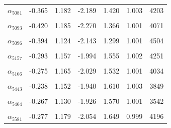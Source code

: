 \begin{longtable}{lrrrrrr}
$\alpha_{5081}$ & -0.365 & 1.182 & -2.189 & 1.420 & 1.003 & 4203\\
\cellcolor{gray!10}{$\alpha_{5083}$} & \cellcolor{gray!10}{-0.378} & \cellcolor{gray!10}{1.200} & \cellcolor{gray!10}{-2.187} & \cellcolor{gray!10}{1.481} & \cellcolor{gray!10}{1.000} & \cellcolor{gray!10}{4548}\\
$\alpha_{5093}$ & -0.420 & 1.185 & -2.270 & 1.366 & 1.001 & 4071\\
\cellcolor{gray!10}{$\alpha_{5095}$} & \cellcolor{gray!10}{0.193} & \cellcolor{gray!10}{1.360} & \cellcolor{gray!10}{-1.600} & \cellcolor{gray!10}{2.563} & \cellcolor{gray!10}{1.003} & \cellcolor{gray!10}{1155}\\
$\alpha_{5096}$ & -0.394 & 1.124 & -2.143 & 1.299 & 1.001 & 4504\\
\cellcolor{gray!10}{$\alpha_{5116}$} & \cellcolor{gray!10}{-0.564} & \cellcolor{gray!10}{1.163} & \cellcolor{gray!10}{-2.444} & \cellcolor{gray!10}{1.163} & \cellcolor{gray!10}{1.000} & \cellcolor{gray!10}{3798}\\
$\alpha_{5157}$ & -0.293 & 1.157 & -1.994 & 1.555 & 1.002 & 4251\\
\cellcolor{gray!10}{$\alpha_{5161}$} & \cellcolor{gray!10}{-0.636} & \cellcolor{gray!10}{1.159} & \cellcolor{gray!10}{-2.503} & \cellcolor{gray!10}{1.059} & \cellcolor{gray!10}{1.001} & \cellcolor{gray!10}{2994}\\
$\alpha_{5166}$ & -0.275 & 1.165 & -2.029 & 1.532 & 1.001 & 4034\\
\cellcolor{gray!10}{$\alpha_{5407}$} & \cellcolor{gray!10}{-0.095} & \cellcolor{gray!10}{1.196} & \cellcolor{gray!10}{-1.818} & \cellcolor{gray!10}{1.845} & \cellcolor{gray!10}{1.001} & \cellcolor{gray!10}{2570}\\
$\alpha_{5443}$ & -0.238 & 1.152 & -1.940 & 1.610 & 1.003 & 3849\\
\cellcolor{gray!10}{$\alpha_{5450}$} & \cellcolor{gray!10}{-0.302} & \cellcolor{gray!10}{1.166} & \cellcolor{gray!10}{-2.031} & \cellcolor{gray!10}{1.536} & \cellcolor{gray!10}{1.001} & \cellcolor{gray!10}{4456}\\
$\alpha_{5464}$ & -0.267 & 1.130 & -1.926 & 1.570 & 1.001 & 3542\\
\cellcolor{gray!10}{$\alpha_{5515}$} & \cellcolor{gray!10}{-0.282} & \cellcolor{gray!10}{1.163} & \cellcolor{gray!10}{-1.991} & \cellcolor{gray!10}{1.527} & \cellcolor{gray!10}{1.001} & \cellcolor{gray!10}{4019}\\
$\alpha_{5581}$ & -0.277 & 1.179 & -2.054 & 1.649 & 0.999 & 4196\\

\end{longtable}
